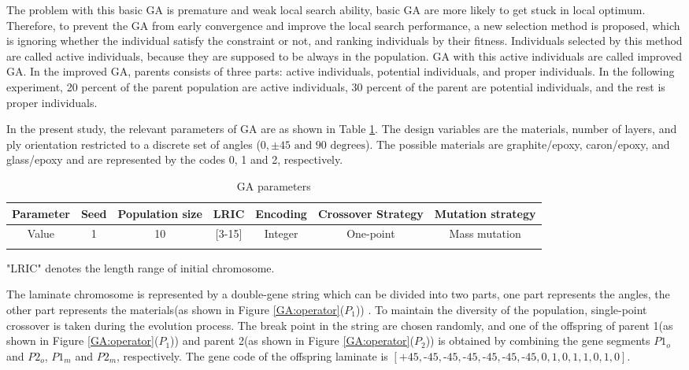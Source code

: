 \documentclass[Afour,sagev,times]{sagej}
\begin{document}
The problem with this basic GA is premature and weak local search ability, basic GA are more likely to get stuck in local
optimum. Therefore, to prevent the GA from early convergence and improve the local search
performance, a new selection method is proposed, which is ignoring whether the individual satisfy
the constraint or not, and ranking individuals by their fitness. Individuals selected by
this method are called active individuals, because they are supposed to be always in the population.
GA with this active individuals are called improved GA.
In the improved GA, parents consists of three parts: active individuals, potential 
individuals, and proper individuals. In the following experiment, 20 percent of the parent
population are active individuals, 30 percent of the parent are potential individuals, and the rest
is proper individuals.


In the present study, the relevant parameters of GA are as shown in Table \ref{tab:ga}. The design
variables are the materials, number of layers, and ply orientation restricted to a discrete set of
angles ($0,\pm 45 \text{ and } 90 \text{ degrees} $). The possible materials are graphite/epoxy,
caron/epoxy, and glass/epoxy and are represented by the codes 0, 1 and 2, respectively.

\begin{table}
\small\sf\centering
\caption{GA parameters}
\begin{tabular}{ccccccc}
	\toprule
	Parameter &  Seed &Population size & LRIC  & Encoding &  Crossover Strategy& Mutation strategy\\
	\midrule
	Value     & 1     &10               & [3-15]& Integer  &  One-point &Mass mutation   \\
	\bottomrule
	\label{tab:ga}
\end{tabular}
\end{table}
\begin{tablenotes}\footnotesize
\item{"LRIC" denotes the length range of initial chromosome.}
\end{tablenotes}


The laminate chromosome is  represented by a double-gene string
which can be divided into two parts, one part represents the angles, the other
part represents the materials(as shown in Figure \ref{GA:operator}($P_1$)) . To maintain
the diversity of the population, single-point crossover is taken during the
evolution process. The break point in the string are chosen randomly, and one of the offspring of parent 1(as shown in Figure
\ref{GA:operator}($P_1$))  and parent 2(as shown in Figure \ref{GA:operator}($P_2$)) is obtained by combining the
gene segments $P1_o$ and $P2_o$, $P1_m$ and $P2_m$, respectively. The gene code of the offspring
laminate is
$[\text{+}45,\text{-}45,\text{-}45,\text{-}45,\text{-}45,\text{-}45,\text{-}45,0,1,0,1,1,0,1,0]$.
\end{document}
